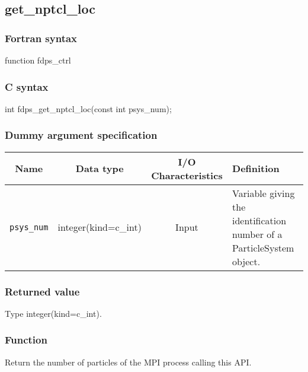 \clearpage

\subsection{get\_nptcl\_loc}
\subsubsection*{Fortran syntax}
\begin{screen}
\begin{spverbatim}
function fdps_ctrl%
\end{spverbatim}
\end{screen}

\subsubsection*{C syntax}
\begin{screen}
\begin{spverbatim}
int fdps_get_nptcl_loc(const int psys_num);
\end{spverbatim}
\end{screen}


\subsubsection*{Dummy argument specification}
\begin{table}[h]
\begin{tabularx}{\linewidth}{cccX}
\toprule
\rowcolor{Snow2}
Name & Data type & I/O Characteristics & Definition \\     
\midrule
\texttt{psys\_num} & integer(kind=c\_int) & Input & Variable giving the identification number of a ParticleSystem object.\\
\bottomrule
\end{tabularx}
\end{table}

\subsubsection*{Returned value}
Type integer(kind=c\_int).

\subsubsection*{Function}
Return the number of particles of the MPI process calling this API.

